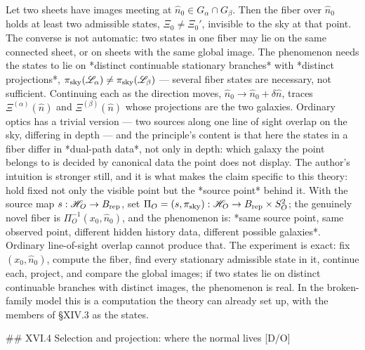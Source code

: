 Let two sheets have images meeting at $\hat n_0\in G_\alpha\cap G_\beta$. Then the fiber over $\hat n_0$ holds at least two admissible states, $\Xi_0\neq\Xi_0'$, invisible to the sky at that point. The converse is not automatic: two states in one fiber may lie on the same connected sheet, or on sheets with the same global image. The phenomenon needs the states to lie on *distinct continuable stationary branches* with *distinct projections*, $\pi_{\rm sky}(\mathscr L_\alpha)\neq\pi_{\rm sky}(\mathscr L_\beta)$ — several fiber states are necessary, not sufficient. Continuing each as the direction moves, $\hat n_0\to\hat n_0+\delta\hat n$, traces $\Xi^{(\alpha)}(\hat n)$ and $\Xi^{(\beta)}(\hat n)$ whose projections are the two galaxies. Ordinary optics has a trivial version — two sources along one line of sight overlap on the sky, differing in depth — and the principle's content is that here the states in a fiber differ in *dual-path data*, not only in depth: which galaxy the point belongs to is decided by canonical data the point does not display. The author's intuition is stronger still, and it is what makes the claim specific to this theory: hold fixed not only the visible point but the *source point* behind it. With the source map $s:\mathscr H_O\to B_{\rm rep}$, set $\Pi_O = (s,\pi_{\rm sky}):\mathscr H_O\to B_{\rm rep}\times S^2_O$; the genuinely novel fiber is $\Pi_O^{-1}(x_0,\hat n_0)$, and the phenomenon is: *same source point, same observed point, different hidden history data, different possible galaxies*. Ordinary line-of-sight overlap cannot produce that. The experiment is exact: fix $(x_0,\hat n_0)$, compute the fiber, find every stationary admissible state in it, continue each, project, and compare the global images; if two states lie on distinct continuable branches with distinct images, the phenomenon is real. In the broken-family model this is a computation the theory can already set up, with the members of §XIV.3 as the states.

## XVI.4 Selection and projection: where the normal lives [D/O]


